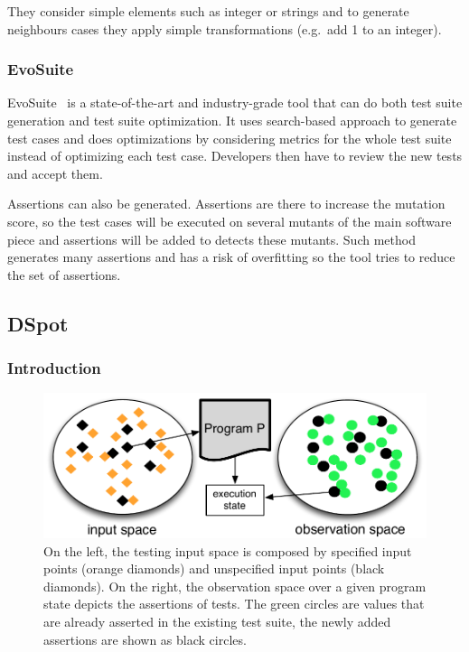 \documentclass[11pt]{sdm}
\newcommand{\evosuite}{EvoSuite\xspace}
\begin{document}
They consider simple elements such as integer or strings and to generate neighbours cases they apply simple transformations (e.g.\ add 1 to an integer).

\subsubsection{EvoSuite}
\label{evosuite}
\evosuite{}~\cite{fraser2011evosuite} is a state-of-the-art and industry-grade tool that can do both test suite generation and test suite optimization.
It uses search-based approach to generate test cases and does optimizations by considering metrics for the whole test suite instead of optimizing each test case.
Developers then have to review the new tests and accept them.

Assertions can also be generated.
Assertions are there to increase the mutation score, so the test cases will be executed on several mutants of the main software piece and assertions will be added to detects these mutants.
Such method generates many assertions and has a risk of overfitting so the tool tries to reduce the set of assertions.


\subsection{DSpot}
\label{testsuite_eval}

\subsubsection{Introduction}
\begin{figure}
  \centering
  \includegraphics[scale=0.5]{io-spaces.pdf}
  \caption{On the left, the testing input space is composed by specified input points (orange diamonds) and unspecified input points (black diamonds). On the right, the observation space over a given program state depicts the assertions of tests. The green circles are values that are already asserted in the existing test suite, the newly added assertions are shown as black circles.}
\label{fig:io-spaces}
\end{figure}
\end{document}
